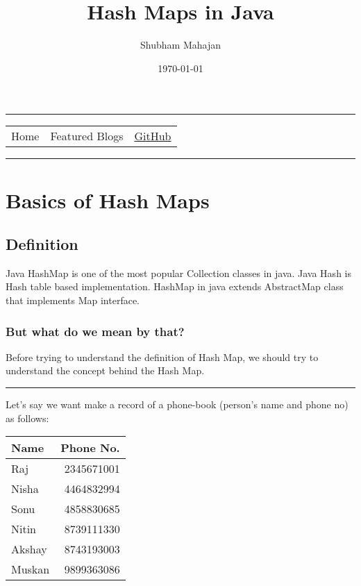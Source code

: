 \documentclass[11pt]{article}
\author{Shubham Mahajan}
\date{\today}
\title{Hash Maps in Java}
\begin{document}
\maketitle
\tableofcontents

\noindent\rule{\textwidth}{0.5pt}

\begin{center}
\begin{tabular}{lll}
Home & Featured Blogs & \href{https://github.com/imahajanshubham}{GitHub}\\
\end{tabular}
\end{center}

\noindent\rule{\textwidth}{0.5pt}

\section{Basics of Hash Maps}
\label{sec:org89f9b04}

\subsection{Definition}
\label{sec:org871fd81}

Java HashMap is one of the most popular Collection classes in java. Java Hash is Hash table based implementation. HashMap in java extends AbstractMap class
that implements Map interface.

\subsubsection{But what do we mean by that?}
\label{sec:org6fe0f6b}

Before trying to understand the definition of Hash Map, we should try to understand
the concept behind the Hash Map.

\noindent\rule{\textwidth}{0.5pt}

Let’s say we want make a record of a phone-book (person’s name and phone no) as
follows:

\begin{center}
\begin{tabular}{lr}
\textbf{Name} & \textbf{Phone No.}\\
\hline
Raj & 2345671001\\
Nisha & 4464832994\\
Sonu & 4858830685\\
Nitin & 8739111330\\
Akshay & 8743193003\\
Muskan & 9899363086\\
\end{tabular}
\end{center}
\end{document}
